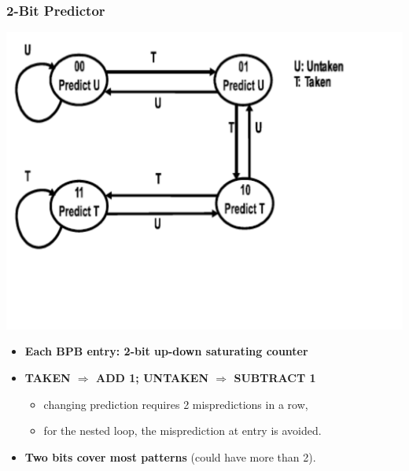 \documentclass{beamer}
\newcommand{\emp}[1]{\textcolor{DikuRed}{ #1}}
\begin{document}
\begin{frame}[fragile,t]
\frametitle{2-Bit Predictor}

\includegraphics[width=55ex]{FigsOoOProc/Predictor2Bit.pdf}
\vspace{-11ex}
\pause

\begin{itemize}
    \item \emp{\bf Each BPB entry: 2-bit up-down saturating counter}\medskip
    \item \emp{\bf TAKEN $\Rightarrow$ ADD 1; UNTAKEN $\Rightarrow$ SUBTRACT 1}
        \begin{itemize}
            \item changing prediction requires 2 mispredictions in a row,
            \item for the nested loop, the misprediction at entry is avoided.
        \end{itemize}\medskip
    \item \emp{\bf Two bits cover most patterns} (could have more than 2).
\end{itemize}
\end{frame}
\end{document}
